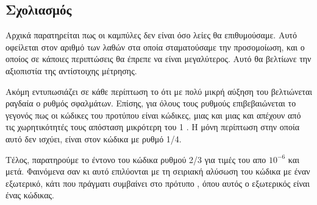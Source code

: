 \subsection{Σχολιασμός}
Αρχικά παρατηρείται πως οι καμπύλες δεν είναι όσο λείες θα επιθυμούσαμε. Αυτό οφείλεται στον αριθμό των λαθών στα οποία σταματούσαμε την προσομοίωση, και ο οποίος σε κάποιες περιπτώσεις θα έπρεπε να είναι μεγαλύτερος. Αυτό θα βελτίωνε την αξιοπιστία της αντίστοιχης μέτρησης.

Ακόμη εντυπωσιάζει σε κάθε περίπτωση το ότι με πολύ μικρή αύξηση του   βελτιώνεται ραγδαία ο ρυθμός σφαλμάτων. Επίσης, για όλους τους ρυθμούς επιβεβαιώνεται το γεγονός πως οι  κώδικες του προτύπου  είναι  κώδικες, μιας και μιας και απέχουν από τις χωρητικότητές τους απόσταση μικρότερη του 1 . Η μόνη περίπτωση στην οποία αυτό δεν ισχύει, είναι στον κώδικα με ρυθμό 1/4.

Τέλος, παρατηρούμε το έντονο  του κώδικα ρυθμού 2/3 για τιμές του  απο $10^{-6}$ και μετά. Φαινόμενα σαν κι αυτό επιλύονται με τη σειριακή αλύσωση του  κώδικα με έναν εξωτερικό, κάτι που πράγματι συμβαίνει στο πρότυπο , όπου αυτός ο εξωτερικός είναι ένας  κώδικας.
